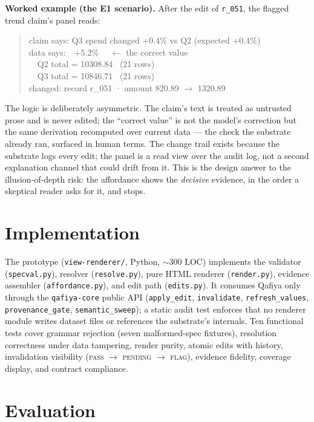 \documentclass[11pt]{article}
\begin{document}
\textbf{Worked example (the E1 scenario).} After the edit of \texttt{r\_051}, the flagged
trend claim's panel reads:

\begin{quote}\small\ttfamily
claim says: Q3 spend changed +0.4\% vs Q2 (expected +0.4\%)\\
data says:~~+5.2\% ~~$\leftarrow$ the correct value\\
~~Q2 total = 10308.84 ~(21 rows)\\
~~Q3 total = 10846.71 ~(21 rows)\\
changed: record r\_051 · amount 820.89 $\to$ 1320.89
\end{quote}

The logic is deliberately asymmetric. The claim's text is treated as untrusted prose and
is never edited; the ``correct value'' is not the model's correction but the same
derivation recomputed over current data --- the check the substrate already ran, surfaced
in human terms. The change trail exists because the substrate logs every edit; the panel
is a read view over the audit log, not a second explanation channel that could drift from
it. This is the design answer to the illusion-of-depth risk: the affordance shows the
\emph{decisive} evidence, in the order a skeptical reader asks for it, and stops.

\section{Implementation}

The prototype (\texttt{view-renderer/}, Python, $\sim$300 LOC) implements the validator
(\texttt{specval.py}), resolver (\texttt{resolve.py}), pure HTML renderer
(\texttt{render.py}), evidence assembler (\texttt{affordance.py}), and edit path
(\texttt{edits.py}). It consumes Qafiya only through the \texttt{qafiya-core} public API
(\texttt{apply\_edit}, \texttt{invalidate}, \texttt{refresh\_values},
\texttt{provenance\_gate}, \texttt{semantic\_sweep}); a static audit test enforces that no
renderer module writes dataset files or references the substrate's internals. Ten
functional tests cover grammar rejection (seven malformed-spec fixtures), resolution
correctness under data tampering, render purity, atomic edits with history, invalidation
visibility (\textsc{pass} $\to$ \textsc{pending} $\to$ \textsc{flag}), evidence fidelity,
coverage display, and contract compliance.

\section{Evaluation}\label{sec:eval}
\end{document}
